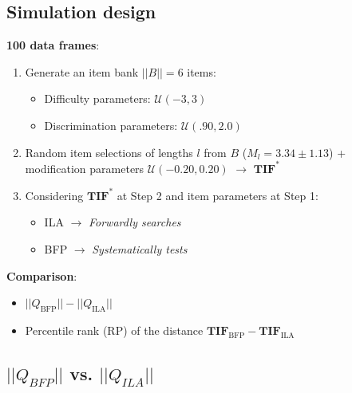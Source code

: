 \documentclass[aspectratio=149, compress]{beamer}
\begin{document}
\subsection*{Simulation design}
\begin{frame}
	
	\small
	\textbf{100 data frames}:
	
	\begin{enumerate}
		\item  Generate an item bank $||B|| = 6$ items: 
		\begin{itemize}
			\item Difficulty parameters: $\mathcal{U}(-3, 3)$
			\item Discrimination parameters:  $\mathcal{U}(.90, 2.0)$
		\end{itemize} 
		
		\item  Random item selections of lengths $l$ from $B$ ($M_l = 3.34 \pm 1.13$) + modification parameters $\mathcal{U}(-0.20, 0.20)$ $\rightarrow$ $\mathbf{TIF}^*$ 
		
		\item  Considering $\mathbf{TIF}^*$ at Step 2 and item parameters at Step 1:
		\begin{itemize}
			\item ILA  $\rightarrow$ \emph{Forwardly searches} %
			\item BFP  $\rightarrow$ \emph{Systematically tests} %
		\end{itemize}
		
	\end{enumerate}
	
	\textbf{Comparison}:
	
	\begin{itemize}
		\item $||Q_{\text{BFP}}|| - ||Q_{\text{ILA}}||$ 
		\item Percentile rank (RP) of the distance $\mathbf{TIF}_{\text{BFP}} - \mathbf{TIF}_{\text{ILA}}$   
	\end{itemize}
	
	
\end{frame}

\subsection*{$||Q_{BFP}||$ vs. $||Q_{ILA}||$}
\end{document}
